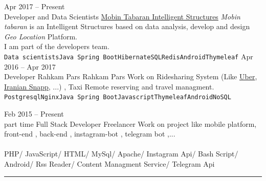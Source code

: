\documentclass[8pt]{developercv} %
\begin{document}
\begin{entrylist}
	\entry
		{Apr 2017 -- Present\\}
		{Developer and Data Scientists}
		{\href{http://mobintabaran.ir}{Mobin Tabaran Intelligent Structures}}
		{\textsl{Mobin tabaran} is an Intelligent Structures based on data analysis, develop and design \textit{Geo Location} Platform.\\ I am part of the developers team.\\
		\texttt{Data scientists}\slashsep\texttt{Java Spring Boot}\slashsep\texttt{Hibernate}\slashsep\texttt{SQL}\slashsep\texttt{Redis}\slashsep\texttt{Android}\slashsep\texttt{Thymeleaf}}
	\entry
		{Apr 2016 -- Apr 2017\\}
		{Developer}
		{Rahkam Pars}
		{Rahkam Pars Work on Ridesharing System (Like
		\href{https://www.uber.com/}{Uber},
		\href{https://snapp.ir/}{Iranian Snapp},
		...) , Taxi Remote reserving and travel managment.\\
		\texttt{Postgresql}\slashsep\texttt{Nginx}\slashsep\texttt{Java Spring Boot}\slashsep\texttt{Javascript}\slashsep\texttt{Thymeleaf}\slashsep\texttt{Android}\slashsep\texttt{NoSQL}
		}

	\entry
		{Feb 2015 -- Present\\\footnotesize{part time}}
		{Full Stack Developer}
		{Freelancer}
		{Work on project like mobile platform, front-end , back-end , instagram-bot , telegram bot ,...\\\\
		\small{PHP}\space\space/\space\space
		\small{JavaScript}\space\space/\space\space
		\small{HTML}\space\space/\space\space
		\small{MySql}\space\space/\space\space
		\small{Apache}\space\space/\space\space
		\small{Instagram Api}\space\space/\space\space
		\small{Bash Script}\space\space/\space\space
		\small{Android}\space\space/\space\space
		\small{Rss Reader}\space\space/\space\space
		\small{Content Managment Service}\space\space/\space\space
		\small{Telegram Api}}


\end{entrylist}

\noindent\rule{\textwidth}{1pt}

\vspace{5pt} %
\end{document}
